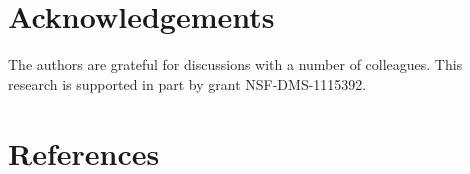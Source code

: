 \documentclass[]{elsarticle}
\theoremstyle{definition}
\theoremstyle{remark}
\begin{document}
\section{Acknowledgements}  The authors are grateful for discussions with a number of colleagues. This research is supported in part by grant NSF-DMS-1115392.

\section*{References}

%

\end{document}
